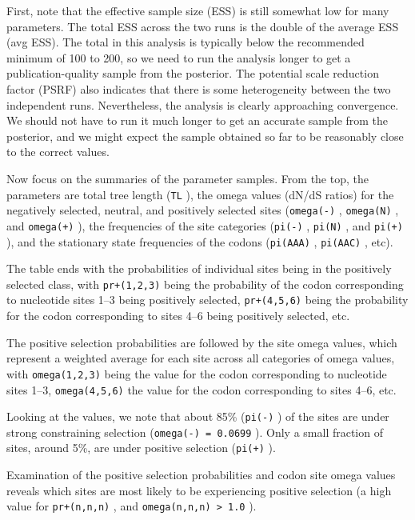 \documentclass[12pt]{book}
\newcommand{\ttt}[1]{\texttt{#1} }
\begin{document}
First, note that the effective sample size (ESS) is still somewhat low for many parameters. The total ESS
across the two runs is the double of the average ESS (avg ESS). The total in this analysis is typically below
the recommended minimum of 100 to 200, so we need to run the analysis longer to get a publication-quality
sample from the posterior. The potential scale reduction factor (PSRF) also indicates that there is some
heterogeneity between the two independent runs. Nevertheless, the analysis is clearly approaching
convergence. We should not have to run it much longer to get an accurate sample from the
posterior, and we might expect the sample obtained so far to be reasonably close to the correct values.

Now focus on the summaries of the parameter samples. From the top, the parameters are
total tree length (\ttt{TL}), the omega values (dN/dS ratios) for the negatively selected, neutral, and
positively selected sites (\ttt{omega(-)}, \ttt{omega(N)}, and \ttt{omega(+)}), the frequencies of the
site categories (\ttt{pi(-)}, \ttt{pi(N)}, and \ttt{pi(+)}), and the stationary state frequencies of
the codons (\ttt{pi(AAA)}, \ttt{pi(AAC)}, etc).

The table ends with the probabilities of individual sites being in the positively selected class, with
\ttt{pr+(1,2,3)} being the probability of the codon corresponding to nucleotide sites 1--3 being positively
selected, \ttt{pr+(4,5,6)} being the probability for the codon corresponding to sites 4--6 being
positively selected, etc.

The positive selection probabilities are followed by the site omega values, which represent a weighted
average for each site across all categories of omega values, with \ttt{omega(1,2,3)} being the value for
the codon corresponding to nucleotide sites 1--3, \ttt{omega(4,5,6)} the value for the codon 
corresponding to sites 4--6, etc.

Looking at the values, we note that about 85\% (\ttt{pi(-)}) of the sites are under strong constraining
selection (\ttt{omega(-) = 0.0699}). Only a small fraction of sites, around 5\%, are under positive
selection (\ttt{pi(+)}).

Examination of the positive selection probabilities and codon site omega values reveals which sites
are most likely to be experiencing positive selection (a high value for \ttt{pr+(n,n,n)}, and
\ttt{omega(n,n,n) > 1.0}). 
\end{document}
